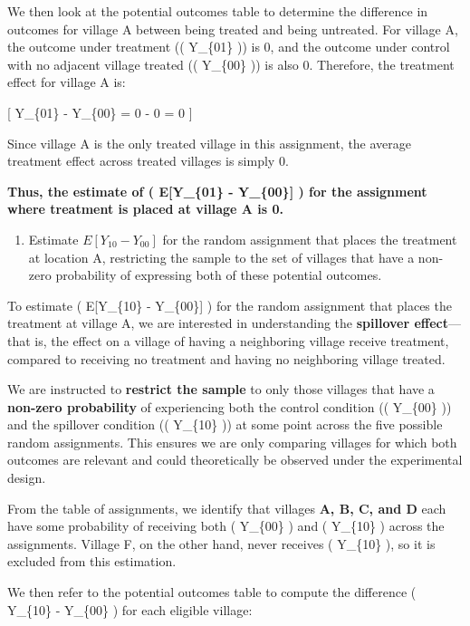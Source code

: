 \documentclass[
  letterpaper,
  DIV=11,
  numbers=noendperiod]{scrartcl}
\providecommand{\tightlist}{%
  \setlength{\itemsep}{0pt}\setlength{\parskip}{0pt}}\usepackage{longtable,booktabs,array}
\begin{document}
We then look at the potential outcomes table to determine the difference
in outcomes for village A between being treated and being untreated. For
village A, the outcome under treatment (( Y\_\{01\} )) is 0, and the
outcome under control with no adjacent village treated (( Y\_\{00\} ))
is also 0. Therefore, the treatment effect for village A is:

{[} Y\_\{01\} - Y\_\{00\} = 0 - 0 = 0 {]}

Since village A is the only treated village in this assignment, the
average treatment effect across treated villages is simply 0.

\textbf{Thus, the estimate of ( E{[}Y\_\{01\} - Y\_\{00\}{]} ) for the
assignment where treatment is placed at village A is 0.}

\begin{enumerate}
\def\labelenumi{\arabic{enumi}.}
\setcounter{enumi}{1}
\tightlist
\item
  Estimate \(E[Y_{10} - Y_{00}]\) for the random assignment that places
  the treatment at location A, restricting the sample to the set of
  villages that have a non-zero probability of expressing both of these
  potential outcomes.
\end{enumerate}

To estimate ( E{[}Y\_\{10\} - Y\_\{00\}{]} ) for the random assignment
that places the treatment at village A, we are interested in
understanding the \textbf{spillover effect}---that is, the effect on a
village of having a neighboring village receive treatment, compared to
receiving no treatment and having no neighboring village treated.

We are instructed to \textbf{restrict the sample} to only those villages
that have a \textbf{non-zero probability} of experiencing both the
control condition (( Y\_\{00\} )) and the spillover condition ((
Y\_\{10\} )) at some point across the five possible random assignments.
This ensures we are only comparing villages for which both outcomes are
relevant and could theoretically be observed under the experimental
design.

From the table of assignments, we identify that villages \textbf{A, B,
C, and D} each have some probability of receiving both ( Y\_\{00\} ) and
( Y\_\{10\} ) across the assignments. Village F, on the other hand,
never receives ( Y\_\{10\} ), so it is excluded from this estimation.

We then refer to the potential outcomes table to compute the difference
( Y\_\{10\} - Y\_\{00\} ) for each eligible village:
\end{document}

